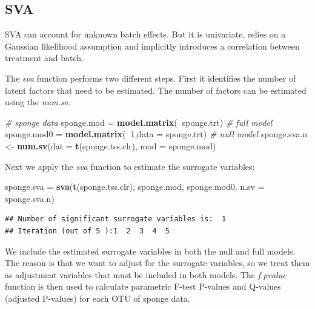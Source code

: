 \documentclass[]{book}
\newenvironment{Shaded}{\begin{snugshade}}{\end{snugshade}}
\newcommand{\KeywordTok}[1]{\textcolor[rgb]{0.13,0.29,0.53}{\textbf{#1}}}
\newcommand{\DataTypeTok}[1]{\textcolor[rgb]{0.13,0.29,0.53}{#1}}
\newcommand{\DecValTok}[1]{\textcolor[rgb]{0.00,0.00,0.81}{#1}}
\newcommand{\StringTok}[1]{\textcolor[rgb]{0.31,0.60,0.02}{#1}}
\newcommand{\CommentTok}[1]{\textcolor[rgb]{0.56,0.35,0.01}{\textit{#1}}}
\newcommand{\OperatorTok}[1]{\textcolor[rgb]{0.81,0.36,0.00}{\textbf{#1}}}
\newcommand{\NormalTok}[1]{#1}
\begin{document}
\subsection{SVA}\label{sva}

SVA can account for unknown batch effects. But it is univariate, relies
on a Gaussian likelihood assumption and implicitly introduces a
correlation between treatment and batch.

The \emph{sva} function performs two different steps. First it
identifies the number of latent factors that need to be estimated. The
number of factors can be estimated using the \emph{num.sv}.

\begin{Shaded}
\begin{Highlighting}[]
\CommentTok{# sponge data}
\NormalTok{sponge.mod =}\StringTok{ }\KeywordTok{model.matrix}\NormalTok{(}\OperatorTok{~}\NormalTok{sponge.trt) }\CommentTok{# full model}
\NormalTok{sponge.mod0 =}\StringTok{ }\KeywordTok{model.matrix}\NormalTok{(}\OperatorTok{~}\DecValTok{1}\NormalTok{,}\DataTypeTok{data =}\NormalTok{ sponge.trt) }\CommentTok{# null model}
\NormalTok{sponge.sva.n <-}\StringTok{ }\KeywordTok{num.sv}\NormalTok{(}\DataTypeTok{dat =} \KeywordTok{t}\NormalTok{(sponge.tss.clr), }\DataTypeTok{mod =}\NormalTok{ sponge.mod)}
\end{Highlighting}
\end{Shaded}

Next we apply the \emph{sva} function to estimate the surrogate
variables:

\begin{Shaded}
\begin{Highlighting}[]
\NormalTok{sponge.sva =}\StringTok{ }\KeywordTok{sva}\NormalTok{(}\KeywordTok{t}\NormalTok{(sponge.tss.clr), sponge.mod, sponge.mod0, }\DataTypeTok{n.sv =}\NormalTok{ sponge.sva.n)}
\end{Highlighting}
\end{Shaded}

\begin{verbatim}
## Number of significant surrogate variables is:  1 
## Iteration (out of 5 ):1  2  3  4  5
\end{verbatim}

We include the estimated surrogate variables in both the null and full
models. The reason is that we want to adjust for the surrogate
variables, so we treat them as adjustment variables that must be
included in both models. The \emph{f.pvalue} function is then used to
calculate parametric F-test P-values and Q-values (adjusted P-values)
for each OTU of sponge data.
\end{document}
